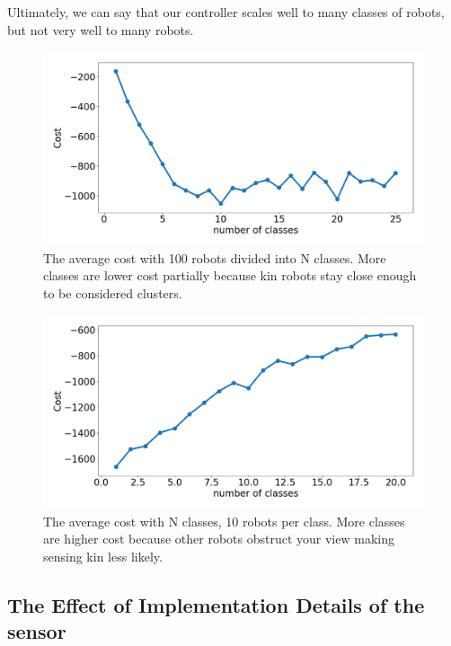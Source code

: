 \documentclass[conference]{IEEEtran}
\begin{document}
    Ultimately, we can say that our controller scales well to many classes of robots, but not very well to many robots.

    \begin{figure}[H]
      \centering
      \includegraphics[width=1\linewidth]{./images/num_classes_vs_cost_100_robots.png}
      \caption{The average cost with 100 robots divided into N classes. More classes are lower cost partially because kin robots stay close enough to be considered clusters.}
      \label{fig:num_classes_100}
    \end{figure}

    \begin{figure}[H]
      \centering
      \includegraphics[width=1\linewidth]{./images/num_classes_vs_cost_10_per_class.png}
      \caption{The average cost with N classes, 10 robots per class. More classes are higher cost because other robots obstruct your view making sensing kin less likely.}
      \label{fig:num_classes_10}
    \end{figure}

  \subsection{The Effect of Implementation Details of the sensor} \label{section:sensor_impl}
\end{document}
